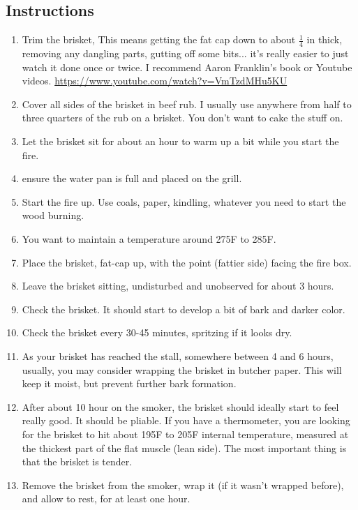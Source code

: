 \begin{multicols}{2}
\subsection*{Instructions}
\begin{enumerate}
    \item Trim the brisket, This means getting the fat cap down to about \( \frac{1}{4} \) in thick, removing any dangling parts, gutting off some bits... it's really easier to just watch it done once or twice. I recommend Aaron Franklin's book or Youtube videos. \url{https://www.youtube.com/watch?v=VmTzdMHu5KU}
    \item Cover all sides of the brisket in beef rub. I usually use anywhere from half to three quarters of the rub on a brisket. You don't want to cake the stuff on.
    \item Let the brisket sit for about an hour to warm up a bit while you start the fire.
    \item ensure the water pan is full and placed on the grill.
    \item Start the fire up. Use coals, paper, kindling, whatever you need to start the wood burning.
    \item You want to maintain a temperature around 275F to 285F.
    \item Place the brisket, fat-cap up, with the point (fattier side) facing the fire box.
    \item Leave the brisket sitting, undisturbed and unobserved for about 3 hours.
    \item Check the brisket. It should start to develop a bit of bark and darker color.
    \item Check the brisket every 30-45 minutes, spritzing if it looks dry.
    \item As your brisket has reached the stall, somewhere between 4 and 6 hours, usually, you may consider wrapping the brisket in butcher paper. This will keep it moist, but prevent further bark formation.
    \item After about 10 hour on the smoker, the brisket should ideally start to feel really good. It should be pliable. If you have a thermometer, you are looking for the brisket to hit about 195F to 205F internal temperature, measured at the thickest part of the flat muscle (lean side). The most important thing is that the brisket is tender.
    \item Remove the brisket from the smoker, wrap it (if it wasn't wrapped before), and allow to rest, for at least one hour.
\end{enumerate}


\end{multicols}

